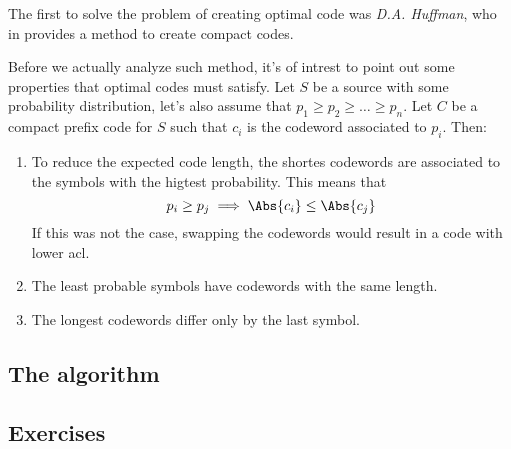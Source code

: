\documentclass{subfiles}
\begin{document}
    The first to solve the problem of creating optimal code was \emph{D.A. Huffman},
       who in \cite{Huffman} provides a method to create compact codes.

        Before we actually analyze such method, 
            it's of intrest to point out some properties that optimal codes 
            must satisfy.
        Let \(S\) be a source with some probability distribution,
        let's also assume that \(p_{1} \ge p_{2} \ge \ldots \ge p_{n}\).
        Let \(C\) be a compact prefix code for \(S\) such that \(c_{i}\) is 
            the codeword associated to \(p_{i}\). Then:
        \begin{enumerate}
            \item To reduce the expected code length, 
                the shortes codewords are associated to the symbols with the higtest
                probability. This means that 
                \[
                   p_{i} \ge p_{j} \implies \Abs{c_{i}} \le \Abs{c_{j}}
                \]
                If this was not the case, 
                swapping the codewords would result in a code with lower \gls{acl}.

            \item The least probable symbols have codewords with the same length.
            \item The longest codewords differ only by the last symbol.
        \end{enumerate}

        \subsection{The algorithm}
        

        \subsection{Exercises}
        
\end{document}
